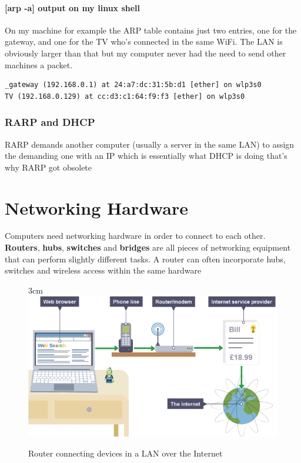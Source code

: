 \documentclass[a4paper,12pt]{book}
\begin{document}
\paragraph{[arp -a] output on my linux shell}
\begin{flushleft}
On my machine for example the ARP table contains just two entries, one for the gateway, and one for the TV who's connected in the same WiFi. The LAN is obviously larger than that but my computer never had the need to send other machines a packet.
\end{flushleft}

\begin{lstlisting}
_gateway (192.168.0.1) at 24:a7:dc:31:5b:d1 [ether] on wlp3s0
TV (192.168.0.129) at cc:d3:c1:64:f9:f3 [ether] on wlp3s0
\end{lstlisting}

\subsubsection{RARP and DHCP}
RARP demands another computer (usually a server in the same LAN) to assign the demanding one with an IP which is essentially what DHCP is doing that's why RARP got obsolete

\clearpage

\section{Networking Hardware}
Computers need networking hardware in order to connect to each other. \textbf{Routers}, \textbf{hubs}, \textbf{switches} and \textbf{bridges} are all pieces of networking equipment that can perform slightly different tasks. A router can often incorporate hubs, switches and wireless access within the same hardware

\begin{figure}[18]{3cm}
\centering
\includegraphics[width=14cm]{./large.PNG}
\caption{Router connecting devices in a LAN over the Internet}\label{wrap-fig:4}
\end{figure}
\end{document}
